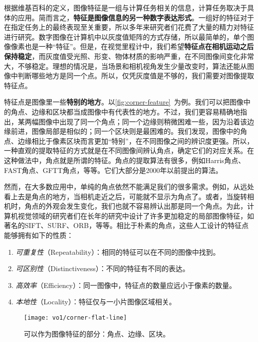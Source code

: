 根据维基百科的定义，图像特征是一组与计算任务相关的信息，计算任务取决于具体的应用\textsuperscript{\cite{wiki:featurecv}}。简而言之，\textbf{特征是图像信息的另一种数字表达形式}。一组好的特征对于在指定任务上的最终表现至关重要，所以多年来研究者们花费了大量的精力对特征进行研究。数字图像在计算机中以灰度值矩阵的方式存储，所以最简单的，单个图像像素也是一种“特征”。但是，在视觉里程计中，我们希望\textbf{特征点在相机运动之后保持稳定}，而灰度值受光照、形变、物体材质的影响严重，在不同图像间变化非常大，不够稳定。理想的情况是，当场景和相机视角发生少量改变时，算法还能从图像中判断哪些地方是同一个点。所以，仅凭灰度值是不够的，我们需要对图像提取特征点。

特征点是图像里一些\textbf{特别的地方}。以\autoref{fig:corner-feature}~为例。我们可以把图像中的角点、边缘和区块都当成图像中有代表性的地方。不过，我们更容易精确地指出，某两幅图像中出现了同一个角点；同一个边缘则稍微困难一些，因为沿着该边缘前进，图像局部是相似的；同一个区块则是最困难的。我们发现，图像中的角点、边缘相比于像素区块而言更加“特别”，在不同图像之间的辨识度更强。所以，一种直观的提取特征的方式就是在不同图像间辨认角点，确定它们的对应关系。在这种做法中，角点就是所谓的特征。角点的提取算法有很多，例如Harris角点\textsuperscript{\cite{Harris1988}}、FAST角点\textsuperscript{\cite{Rosten2006}}、GFTT角点\textsuperscript{\cite{Shi1994}}，等等。它们大部分是2000年以前提出的算法。

然而，在大多数应用中，单纯的角点依然不能满足我们的很多需求。例如，从远处看上去是角点的地方，当相机走近之后，可能就不显示为角点了。或者，当旋转相机时，角点的外观会发生变化，我们也就不容易辨认出那是同一个角点。为此，计算机视觉领域的研究者们在长年的研究中设计了许多更加稳定的局部图像特征，如著名的SIFT\textsuperscript{\cite{Lowe2004}}、SURF\textsuperscript{\cite{Bay2006}}、ORB\textsuperscript{\cite{Rublee2011}}，等等。相比于朴素的角点，这些人工设计的特征点能够拥有如下的性质：

\begin{enumerate}
\item \emph{可重复性}（Repeatability）：相同的特征可以在不同的图像中找到。
\item \emph{可区别性}（Distinctiveness）：不同的特征有不同的表达。
\item \emph{高效率}（Efficiency）：同一图像中，特征点的数量应远小于像素的数量。
\item \emph{本地性}（Locality）：特征仅与一小片图像区域相关。
\end{enumerate}

\begin{figure}[!ht]
    \centering
    \texttt{[image: vo1/corner-flat-line]}\\
    \caption{可以作为图像特征的部分：角点、边缘、区块。}
    \label{fig:corner-feature}
\end{figure}

